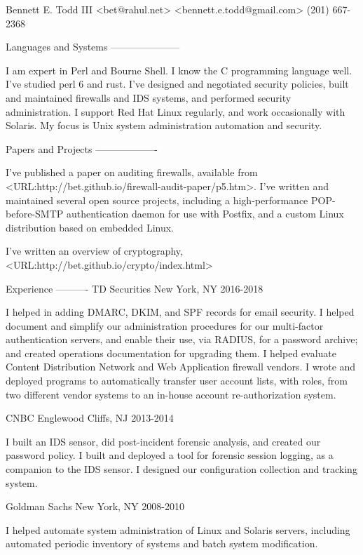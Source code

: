 \documentclass{article}
\begin{document}
\begin{center}
Bennett E. Todd III
<bet@rahul.net>
<bennett.e.todd@gmail.com>
(201) 667-2368
\end{center}

Languages and Systems
---------------------

I am expert in Perl and Bourne Shell. I know the C programming
language well. I've studied perl 6 and rust. I've designed and
negotiated security policies, built and maintained firewalls and IDS
systems, and performed security administration. I support Red Hat
Linux regularly, and work occasionally with Solaris. My focus is
Unix system administration automation and security.

Papers and Projects
-------------------

I've published a paper on auditing firewalls, available from
<URL:http://bet.github.io/firewall-audit-paper/p5.htm>. I've
written and maintained several open source projects, including a
high-performance POP-before-SMTP authentication daemon for use with
Postfix, and a custom Linux distribution based on embedded Linux.

I've written an overview of cryptography,
<URL:http://bet.github.io/crypto/index.html>

Experience
----------
TD Securities \hfill New York, NY
2016-2018

I helped in adding DMARC, DKIM, and SPF records for email
security. I helped document and simplify our administration
procedures for our multi-factor authentication servers, and
enable their use, via RADIUS, for a password archive; and created
operations documentation for upgrading them. I helped evaluate
Content Distribution Network and Web Application firewall vendors.
I wrote and deployed programs to automatically transfer user
account lists, with roles, from two different vendor systems to an
in-house account re-authorization system.

CNBC \hfill Englewood Cliffs, NJ
2013-2014

I built an IDS sensor, did post-incident forensic analysis, and
created our password policy. I built and deployed a tool for forensic
session logging, as a companion to the IDS sensor. I designed our
configuration collection and tracking system.

Goldman Sachs \hfill New York, NY
2008-2010

I helped automate system administration of Linux and Solaris
servers, including automated periodic inventory of systems
and batch system modification.
\end{document}
